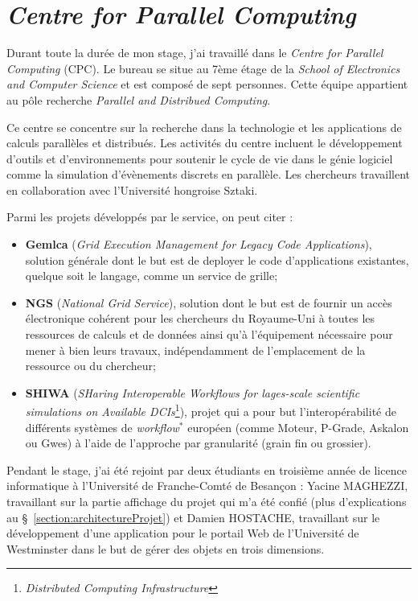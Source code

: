 \section{\textit{Centre for Parallel Computing}}

Durant toute la dur\'ee de mon stage, j'ai travaill\'e dans le \textit{Centre for Parallel Computing} (CPC).
Le bureau se situe au 7\`eme \'etage de la \textit{School of Electronics and Computer Science} et est compos\'e de sept personnes.
Cette \'equipe appartient au p\^ole recherche \textit{Parallel and Distribued Computing}.

Ce centre se concentre sur la recherche dans la technologie et les applications de calculs parall\`eles et distribu\'es.
Les activit\'es du centre incluent le d\'eveloppement d'outils et d'environnements pour soutenir le cycle de vie dans le g\'enie logiciel comme la simulation d'\'ev\`enements discrets en parall\`ele.
Les chercheurs travaillent en collaboration avec l'Universit\'e hongroise Sztaki.

\noindent Parmi les projets d\'evelopp\'es par le service, on peut citer :

\begin{itemize}
	\item \textbf{Gemlca} (\textit{Grid Execution Management for Legacy Code Applications}), solution g\'en\'erale dont le but est de deployer le code d'applications existantes, quelque soit le langage, comme un service de grille;
	\item \textbf{NGS} (\textit{National Grid Service}), solution dont le but est de fournir un acc\`es \'electronique coh\'erent pour les chercheurs du Royaume-Uni \`a toutes les ressources de calculs et de donn\'ees ainsi qu'\`a l'\'equipement n\'ecessaire pour mener \`a bien leurs travaux, ind\'ependamment de l'emplacement de la ressource ou du chercheur;
	\item \textbf{SHIWA} (\textit{SHaring Interoperable Workflows for lages-scale scientific simulations on Available DCIs}\protect\footnote{\textit{Distributed Computing Infrastructure}}), projet qui a pour but l'interop\'erabilit\'e de diff\'erents syst\`emes de \textit{workflow}$^*$ europ\'een (comme Moteur, P-Grade, Askalon ou Gwes) \`a l'aide de l'approche par granularit\'e (grain fin ou grossier).

\end{itemize}

\vspace{0.20cm}

Pendant le stage, j'ai \'et\'e rejoint par deux \'etudiants en troisi\`eme ann\'ee de licence informatique \`a l'Universit\'e de Franche-Comt\'e de Besan\c{c}on : Yacine MAGHEZZI, travaillant sur la partie affichage du projet qui m'a \'et\'e confi\'e (plus d'explications au \S~\ref{section:architectureProjet}) et Damien HOSTACHE, travaillant sur le d\'eveloppement d'une application pour le portail Web de l'Universit\'e de Westminster dans le but de g\'erer des objets en trois dimensions.


\clearpage
